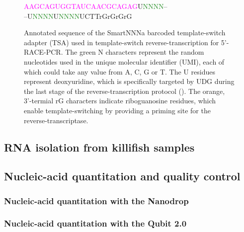 \begin{figure}
\begin{center}
\LARGE
\textcolor{Fuchsia}{AAGCAGUGGTAUCAACGCAGAG}U\textcolor{ForestGreen}{NNNN}--\\--U\textcolor{ForestGreen}{NNNN}U\textcolor{ForestGreen}{NNNN}UCTT\textcolor{BurntOrange}{rGrGrGrG}
\end{center}
\caption{Annotated sequence of the SmartNNNa barcoded template-switch adapter (TSA) used in template-switch reverse-transcription for 5'-RACE-PCR. The green N characters represent the random nucleotides used in the unique molecular identifier (UMI), each of which could take any value from A, C, G or T. The U residues represent deoxyuridine, which is specifically targeted by UDG during the last stage of the reverse-transcription protocol (). The orange, 3'-termial rG characters indicate riboguanosine residues, which enable template-switching by providing a priming site for the reverse-transcriptase.} %
\label{fig:tsa}
\end{figure}


\subsection{RNA isolation from killifish samples}

\subsection{Nucleic-acid quantitation and quality control}

\subsubsection{Nucleic-acid quantitation with the Nanodrop} %

\subsubsection{Nucleic-acid quantitation with the Qubit 2.0} %

